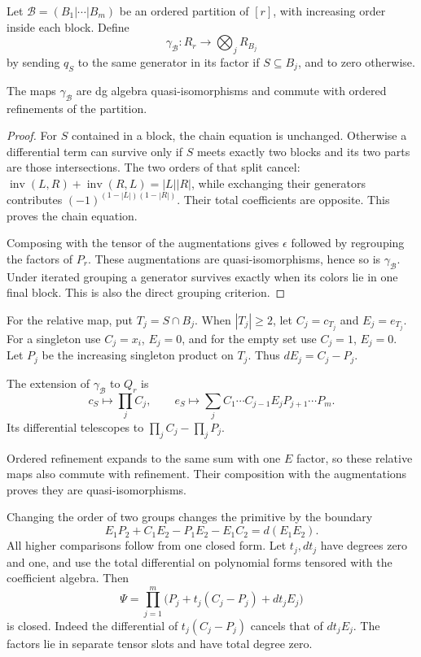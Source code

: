 Let $\mathcal B=(B_1|\cdots|B_m)$ be an ordered
partition of $[r]$, with increasing order inside
each block. Define
\[
 \gamma_{\mathcal B}:R_r\longrightarrow
                           \bigotimes_jR_{B_j}
\]
by sending $q_S$ to the same generator in its
factor if $S\subseteq B_j$, and to zero otherwise.

\begin{proposition}\label{cbc:va:grouping}
The maps $\gamma_{\mathcal B}$ are dg algebra
quasi-isomorphisms and commute with ordered
refinements of the partition.
\end{proposition}
\begin{proof}
For $S$ contained in a block, the chain equation
is unchanged. Otherwise a differential term can
survive only if $S$ meets exactly two blocks and
its two parts are those intersections.
The two orders of that split cancel:
$\operatorname{inv}(L,R)+\operatorname{inv}(R,L)=|L||R|$,
while exchanging their generators contributes
$(-1)^{(1-|L|)(1-|R|)}$.
Their total coefficients are opposite.
This proves the chain equation.

Composing with the tensor of the augmentations
gives $\epsilon$ followed by regrouping the
factors of $P_r$. These augmentations are
quasi-isomorphisms, hence so is $\gamma_{\mathcal B}$.
Under iterated grouping a generator survives
exactly when its colors lie in one final block.
This is also the direct grouping criterion.
\end{proof}

For the relative map, put $T_j=S\cap B_j$.
When $|T_j|\geq2$, let $C_j=c_{T_j}$ and
$E_j=e_{T_j}$. For a singleton use $C_j=x_i$,
$E_j=0$, and for the empty set use $C_j=1$,
$E_j=0$. Let $P_j$ be the increasing singleton
product on $T_j$. Thus $dE_j=C_j-P_j$.

The extension of $\gamma_{\mathcal B}$ to $Q_r$
is
\begin{equation}\label{cbc:va:relative-grouping}
 c_S\longmapsto\prod_jC_j,\qquad
 e_S\longmapsto
       \sum_jC_1\cdots C_{j-1}E_jP_{j+1}\cdots P_m.
\end{equation}
Its differential telescopes to
$\prod_jC_j-\prod_jP_j$.

Ordered refinement expands to the same sum with
one $E$ factor, so these relative maps also
commute with refinement. Their composition with
the augmentations proves they are
quasi-isomorphisms.

Changing the order of two groups changes the
primitive by the boundary
\begin{equation}\label{cbc:va:grouping-square}
 E_1P_2+C_1E_2-P_1E_2-E_1C_2=d(E_1E_2).
\end{equation}
All higher comparisons follow from one closed form.
Let $t_j,dt_j$ have degrees zero and one, and use
the total differential on polynomial forms
tensored with the coefficient algebra. Then
\begin{equation}\label{cbc:va:grouping-cube}
 \Psi=\prod_{j=1}^m
       \bigl(P_j+t_j(C_j-P_j)+dt_jE_j\bigr)
\end{equation}
is closed. Indeed the differential of $t_j(C_j-P_j)$
cancels that of $dt_jE_j$. The factors lie in
separate tensor slots and have total degree zero.

